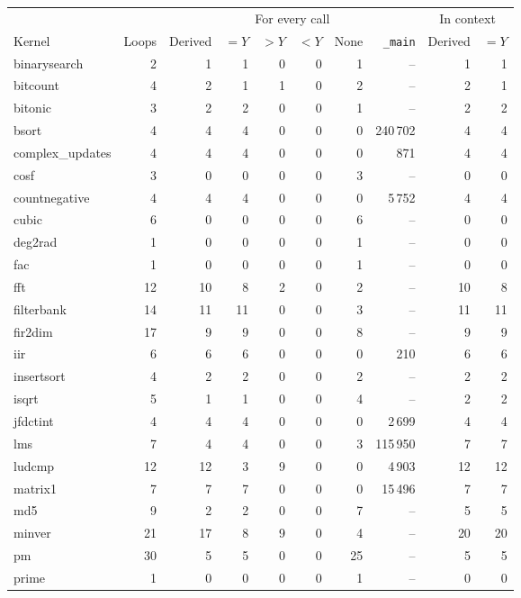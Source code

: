 \documentclass[oneside,english]{amsart}
\numberwithin{equation}{section}
\numberwithin{figure}{section}
\theoremstyle{plain}
\theoremstyle{definition}
\theoremstyle{plain}
\theoremstyle{remark}
\theoremstyle{plain}
\theoremstyle{definition}
\theoremstyle{plain}
\theoremstyle{remark}
\begin{document}
\begin{table}[ht]
\centering
\footnotesize
\setlength{\tabcolsep}{4pt}
\begin{tabular}{@{}lrrrrrrrrr@{}}
\toprule
 & & \multicolumn{6}{c}{For every call} & \multicolumn{2}{c}{In context} \\
\cmidrule(lr){3-8}\cmidrule(l){9-10}
Kernel & Loops & Derived & $= Y$ & $> Y$ & $< Y$ & None & \texttt{\_main} & Derived & $= Y$ \\
\midrule
binarysearch & 2 & 1 & 1 & 0 & 0 & 1 & -- & 1 & 1 \\
bitcount & 4 & 2 & 1 & 1 & 0 & 2 & -- & 2 & 1 \\
bitonic & 3 & 2 & 2 & 0 & 0 & 1 & -- & 2 & 2 \\
bsort & 4 & 4 & 4 & 0 & 0 & 0 & 240\,702 & 4 & 4 \\
complex\_updates & 4 & 4 & 4 & 0 & 0 & 0 & 871 & 4 & 4 \\
cosf & 3 & 0 & 0 & 0 & 0 & 3 & -- & 0 & 0 \\
countnegative & 4 & 4 & 4 & 0 & 0 & 0 & 5\,752 & 4 & 4 \\
cubic & 6 & 0 & 0 & 0 & 0 & 6 & -- & 0 & 0 \\
deg2rad & 1 & 0 & 0 & 0 & 0 & 1 & -- & 0 & 0 \\
fac & 1 & 0 & 0 & 0 & 0 & 1 & -- & 0 & 0 \\
fft & 12 & 10 & 8 & 2 & 0 & 2 & -- & 10 & 8 \\
filterbank & 14 & 11 & 11 & 0 & 0 & 3 & -- & 11 & 11 \\
fir2dim & 17 & 9 & 9 & 0 & 0 & 8 & -- & 9 & 9 \\
iir & 6 & 6 & 6 & 0 & 0 & 0 & 210 & 6 & 6 \\
insertsort & 4 & 2 & 2 & 0 & 0 & 2 & -- & 2 & 2 \\
isqrt & 5 & 1 & 1 & 0 & 0 & 4 & -- & 2 & 2 \\
jfdctint & 4 & 4 & 4 & 0 & 0 & 0 & 2\,699 & 4 & 4 \\
lms & 7 & 4 & 4 & 0 & 0 & 3 & 115\,950 & 7 & 7 \\
ludcmp & 12 & 12 & 3 & 9 & 0 & 0 & 4\,903 & 12 & 12 \\
matrix1 & 7 & 7 & 7 & 0 & 0 & 0 & 15\,496 & 7 & 7 \\
md5 & 9 & 2 & 2 & 0 & 0 & 7 & -- & 5 & 5 \\
minver & 21 & 17 & 8 & 9 & 0 & 4 & -- & 20 & 20 \\
pm & 30 & 5 & 5 & 0 & 0 & 25 & -- & 5 & 5 \\
prime & 1 & 0 & 0 & 0 & 0 & 1 & -- & 0 & 0 \\

\end{tabular}
\end{table}
\end{document}
